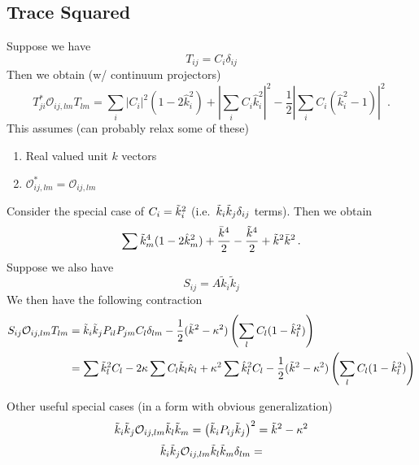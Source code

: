 \documentclass{revtex4}
\begin{document}
\subsection{Trace Squared}
Suppose we have
\begin{equation}
  T_{ij} = C_i\delta_{ij}
\end{equation}
Then we obtain (w/ continuum projectors)
\begin{equation}
  T_{ji}^*\mathcal{O}_{ij,lm}T_{lm} = \sum_i |C_i|^2(1-2\hat{k}_i^2) + \left|\sum_i C_i\hat{k}_i^2\right|^2 - \frac{1}{2}\left|\sum_i C_i(\hat{k}_i^2-1)\right|^2 \, .
\end{equation}
This assumes (can probably relax some of these)
\begin{enumerate}
\item Real valued unit $k$ vectors
\item $\mathcal{O}_{ij,lm}^* = \mathcal{O}_{ij,lm}$
\end{enumerate}
Consider the special case of $C_i = \tilde{k}_i^2$ (i.e.\ $\tilde{k}_i\tilde{k}_j\delta_{ij}$ terms).
Then we obtain
\begin{equation}
  \sum \tilde{k}_m^4(1-2\hat{k}_m^2) + \frac{\bar{k}^4}{2} - \frac{\tilde{k}^4}{2} + \tilde{k}^2\bar{k}^2 \, .
\end{equation}
Suppose we also have
\begin{equation}
  S_{ij} = A\tilde{k}_i\tilde{k}_j
\end{equation}
We then have the following contraction
\begin{align}
  S_{ij}\mathcal{O}_{ij,lm}T_{lm} &= \tilde{k}_i\tilde{k}_jP_{il}P_{jm}C_l\delta_{lm} - \frac{1}{2}(\tilde{k}^2-\kappa^2)\left(\sum_l C_l(1-\hat{k}_l^2)\right) \\
  &= \sum \tilde{k}_l^2C_l - 2\kappa\sum C_l\tilde{k}_l\hat{\kappa}_l + \kappa^2\sum\hat{k}_l^2C_l - \frac{1}{2}(\tilde{k}^2-\kappa^2)\left(\sum_l C_l(1-\hat{k}_l^2)\right)
\end{align}

Other useful special cases (in a form with obvious generalization)
\begin{equation}
  \tilde{k}_i\tilde{k}_j\mathcal{O}_{ij,lm}\tilde{k}_l\tilde{k}_m = \left(\tilde{k}_iP_{ij}\tilde{k}_j\right)^2 = \tilde{k}^2-\kappa^2
\end{equation}
\begin{equation}
  \tilde{k}_i\tilde{k}_j\mathcal{O}_{ij,lm}\tilde{k}_l\tilde{k}_m\delta_{lm} = 
\end{equation}
\end{document}
